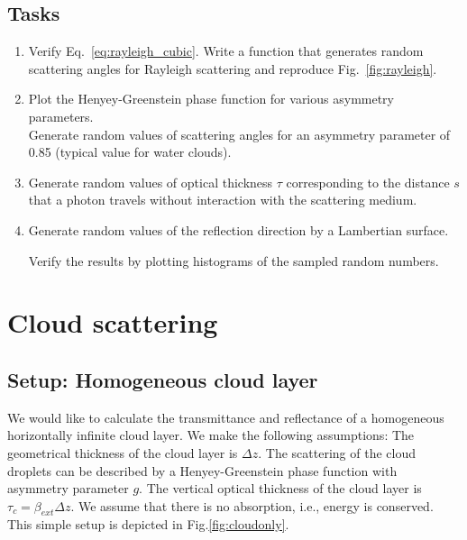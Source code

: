 \documentclass[12pt,twoside,a4paper]{article}
\begin{document}
\subsection{Tasks}

\begin{enumerate}
\item Verify Eq.~\ref{eq:rayleigh_cubic}. Write a function that
  generates random scattering angles for Rayleigh scattering and
  reproduce Fig.~\ref{fig:rayleigh}.
\item Plot the Henyey-Greenstein phase function for various asymmetry 
  parameters.\\ 
  Generate random values of scattering angles for an asymmetry
  parameter of 0.85 (typical value for water clouds). 
\item Generate random values of optical thickness
  $\tau$ corresponding to the distance $s$ that a photon travels without
  interaction with the scattering medium. 
\item Generate random values of the reflection direction by a
  Lambertian surface.

Verify the results by plotting histograms of the sampled random numbers.

\end{enumerate}

\cleardoublepage

\section{Cloud scattering}
\label{sec:clouds}

\subsection{Setup: Homogeneous cloud layer}

We would like to calculate the transmittance and reflectance of a
homogeneous horizontally infinite cloud layer. We make the following
assumptions: The geometrical thickness of the cloud layer is $\Delta z$. The
scattering of the cloud droplets can be described by a
Henyey-Greenstein phase function with asymmetry parameter $g$.  
The vertical optical thickness of the cloud layer is
$\tau_c=\beta_{ext} \Delta z$. We assume that there is 
no absorption, i.e., energy is conserved. This simple setup is depicted in
Fig.\ref{fig:cloudonly}. 
\end{document}
